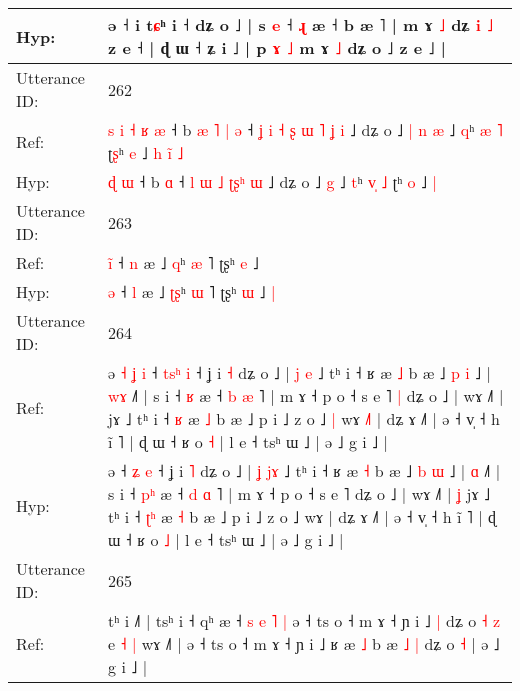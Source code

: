 \documentclass[10pt]{article}
\DeclareRobustCommand{\hl}[1]{{\textcolor{red}{#1}}}
\begin{document}
\begin{longtable}{ll}
 \\
Hyp: & ə ˧\hl{}\hl{} i\hl{}\hl{} t\hl{ɕ}ʰ\hl{}\hl{}\hl{}\hl{}\hl{}\hl{} i ˧ dʑ o ˩ | s \hl{e} ˧ \hl{ɻ} æ ˧ b æ ˥ | m ɤ \hl{˩} dʑ \hl{i} \hl{˩} z e ˧ | ɖ ɯ ˧ ʑ i ˩ | p\hl{}\hl{}\hl{}\hl{}\hl{}\hl{}\hl{}\hl{}\hl{} \hl{ɤ} \hl{˩} m ɤ \hl{˩} dʑ o ˩ z e ˩ |
 \\
\midrule
Utterance ID: & 262 \\
Ref: & \hl{s}\hl{ }\hl{i}\hl{ }\hl{˧}\hl{ }\hl{ʁ} \hl{æ} ˧ b\hl{ }\hl{æ}\hl{ }\hl{˥}\hl{ }\hl{|} \hl{ə} ˧\hl{ }\hl{ʝ}\hl{ }\hl{i} \hl{˧} \hl{ʂ} \hl{ɯ} \hl{˥}\hl{ }\hl{ʝ} \hl{i} ˩ dʑ o ˩\hl{ }\hl{|}\hl{ }\hl{n} \hl{æ} ˩ \hl{q}ʰ \hl{}\hl{æ} \hl{˥} ʈ\hl{ʂ}ʰ \hl{e} ˩\hl{ }\hl{h}\hl{ }\hl{i}\hl{̃} \hl{˩}
 \\
Hyp: & \hl{}\hl{}\hl{}\hl{}\hl{}\hl{}\hl{ɖ} \hl{ɯ} ˧ b\hl{}\hl{}\hl{}\hl{}\hl{}\hl{} \hl{ɑ} ˧\hl{}\hl{}\hl{}\hl{} \hl{l} \hl{ɯ} \hl{˩} \hl{ʈ}\hl{ʂ}\hl{ʰ} \hl{ɯ} ˩ dʑ o ˩\hl{}\hl{}\hl{}\hl{} \hl{g} ˩ \hl{t}ʰ \hl{v}\hl{̩} \hl{˩} ʈ\hl{}ʰ \hl{o} ˩\hl{}\hl{}\hl{}\hl{}\hl{} \hl{|}
 \\
\midrule
Utterance ID: & 263 \\
Ref: & \hl{i}\hl{̃} ˧ \hl{n} æ ˩ \hl{}\hl{q}ʰ \hl{æ} ˥ ʈʂʰ \hl{e} ˩\hl{}\hl{}
 \\
Hyp: & \hl{}\hl{ə} ˧ \hl{l} æ ˩ \hl{ʈ}\hl{ʂ}ʰ \hl{ɯ} ˥ ʈʂʰ \hl{ɯ} ˩\hl{ }\hl{|}
 \\
\midrule
Utterance ID: & 264 \\
Ref: & ə\hl{ }\hl{˧}\hl{ }\hl{ʝ}\hl{ }\hl{i} ˧ \hl{t}\hl{s}\hl{ʰ} \hl{i} ˧ ʝ i \hl{˧} dʑ o ˩ | \hl{j} \hl{}\hl{e} ˩ tʰ i ˧ ʁ æ \hl{˩} b æ ˩ \hl{p} \hl{i} ˩ | \hl{w}\hl{ɤ} ˩˥ | s i ˧ \hl{}\hl{ʁ} æ ˧ \hl{b} \hl{æ} ˥ | m ɤ ˧ p o ˧ s e ˥\hl{ }\hl{|} dʑ o ˩ | wɤ ˩˥ |\hl{}\hl{} jɤ ˩ tʰ i ˧ \hl{}\hl{ʁ} æ \hl{˩} b æ ˩ p i ˩ z o ˩\hl{ }\hl{|} wɤ\hl{ }\hl{˩}\hl{˥} | dʑ ɤ ˩˥ | ə ˧ v̩ ˧ h ĩ ˥ | ɖ ɯ ˧ ʁ o \hl{˧} | l e ˧ tsʰ ɯ ˩ | ə ˩ g i ˩ |
 \\
Hyp: & ə\hl{}\hl{}\hl{}\hl{}\hl{}\hl{} ˧ \hl{}\hl{}\hl{ʑ} \hl{e} ˧ ʝ i \hl{˥} dʑ o ˩ | \hl{ʝ} \hl{j}\hl{ɤ} ˩ tʰ i ˧ ʁ æ \hl{˧} b æ ˩ \hl{b} \hl{ɯ} ˩ | \hl{}\hl{ɑ} ˩˥ | s i ˧ \hl{p}\hl{ʰ} æ ˧ \hl{d} \hl{ɑ} ˥ | m ɤ ˧ p o ˧ s e ˥\hl{}\hl{} dʑ o ˩ | wɤ ˩˥ |\hl{ }\hl{ʝ} jɤ ˩ tʰ i ˧ \hl{ʈ}\hl{ʰ} æ \hl{˧} b æ ˩ p i ˩ z o ˩\hl{}\hl{} wɤ\hl{}\hl{}\hl{} | dʑ ɤ ˩˥ | ə ˧ v̩ ˧ h ĩ ˥ | ɖ ɯ ˧ ʁ o \hl{˩} | l e ˧ tsʰ ɯ ˩ | ə ˩ g i ˩ |
 \\
\midrule
Utterance ID: & 265 \\
Ref: & tʰ i ˩˥ | tsʰ i ˧ qʰ æ ˧ \hl{s}\hl{ }\hl{e} \hl{˥} \hl{|} ə ˧ ts o ˧ m ɤ ˧ ɲ i ˩\hl{ }\hl{|} dʑ o \hl{˧} \hl{z} e\hl{ }\hl{˧} \hl{|} wɤ ˩\hl{˥} | ə ˧ ts o ˧ m ɤ ˧ ɲ i ˩\hl{}\hl{} ʁ æ \hl{˩} b æ\hl{ }\hl{˩} \hl{|} dʑ o \hl{˧} | ə ˩ g i ˩ |

\end{longtable}
\end{document}
